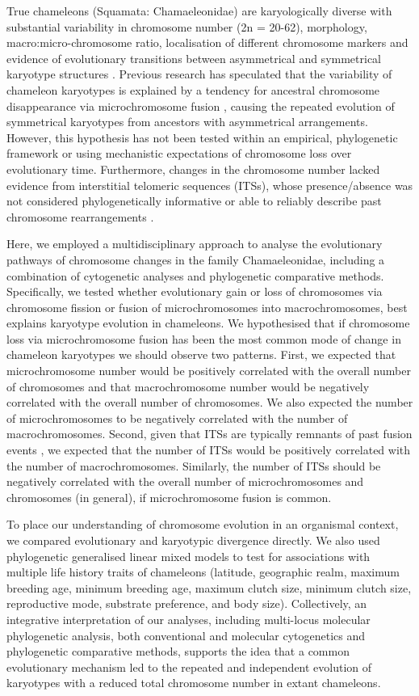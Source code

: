 \documentclass[a4paper, 12pt]{article}
\begin{document}
True chameleons (Squamata: Chamaeleonidae) are karyologically diverse with substantial variability in chromosome number (2n = 20-62), morphology, macro:micro-chromosome ratio, localisation of different chromosome markers and evidence of evolutionary transitions between asymmetrical and symmetrical karyotype structures \citep{rovatsos2017evolution,nielsen2018dynamic}.
Previous research has speculated that the variability of chameleon karyotypes is explained by a tendency for ancestral chromosome disappearance via microchromosome fusion \citep{rovatsos2017evolution}, causing the repeated evolution of symmetrical karyotypes from ancestors with asymmetrical arrangements. 
However, this hypothesis has not been tested within an empirical, phylogenetic framework or using mechanistic expectations of chromosome loss over evolutionary time. 
Furthermore, changes in the chromosome number lacked evidence from interstitial telomeric sequences (ITSs), whose presence/absence was not considered phylogenetically informative or able to reliably describe past chromosome rearrangements \citep{rovatsos2017evolution}.

Here, we employed a multidisciplinary approach to analyse the evolutionary pathways of chromosome changes in the family Chamaeleonidae, including a combination of cytogenetic analyses and phylogenetic comparative methods. 
Specifically, we tested whether evolutionary gain or loss of chromosomes via chromosome fission or fusion of microchromosomes into macrochromosomes, best explains karyotype evolution in chameleons. 
We hypothesised that if chromosome loss via microchromosome fusion has been the most common mode of change in chameleon karyotypes we should observe two patterns. 
First, we expected that microchromosome number would be positively correlated with the overall number of chromosomes and that macrochromosome number would be negatively correlated with the overall number of chromosomes. 
We also expected the number of microchromosomes to be negatively correlated with the number of macrochromosomes. 
Second, given that ITSs are typically remnants of past fusion events \citep{bolzan2017interstitial}, we expected that the number of ITSs would be positively correlated with the number of macrochromosomes. 
Similarly, the number of ITSs should be negatively correlated with the overall number of microchromosomes and chromosomes (in general), if microchromosome fusion is common. 

To place our understanding of chromosome evolution in an organismal context, we compared evolutionary and karyotypic divergence directly. 
We also used phylogenetic generalised linear mixed models to test for associations with multiple life history traits of chameleons (latitude, geographic realm, maximum breeding age, minimum breeding age, maximum clutch size, minimum clutch size, reproductive mode, substrate preference, and body size). 
Collectively, an integrative interpretation of our analyses, including multi-locus molecular phylogenetic analysis, both conventional and molecular cytogenetics and phylogenetic comparative methods, supports the idea that a common evolutionary mechanism led to the repeated and independent evolution of karyotypes with a reduced total chromosome number in extant chameleons.
\end{document}
